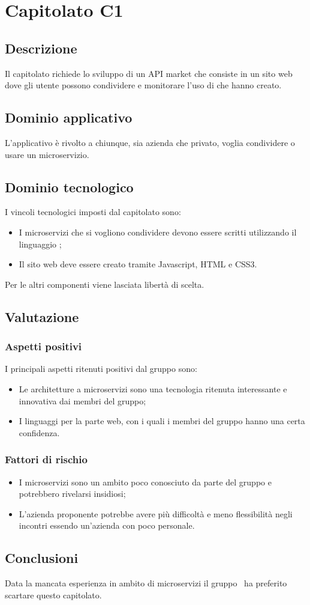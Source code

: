 \documentclass[../StudioDiFattibilita.tex]{subfiles}
\begin{document}
	\section{Capitolato C1}
		\subsection{Descrizione}
		Il capitolato richiede lo sviluppo di un API market che consiste in un sito web dove gli utente possono condividere e monitorare l'uso di  che hanno creato.
		\subsection{Dominio applicativo}
		L'applicativo è rivolto a chiunque, sia azienda che privato, voglia condividere o usare un microservizio.
		\subsection{Dominio tecnologico} 
		I vincoli tecnologici imposti dal capitolato sono:
		\begin{itemize}
			\item I microservizi che si vogliono condividere devono essere scritti utilizzando il linguaggio ;
			\item Il sito web deve essere creato tramite Javascript, HTML e CSS3.
		\end{itemize}
		Per le altri componenti viene lasciata libertà di scelta.
		\subsection{Valutazione}
			\subsubsection{Aspetti positivi}
			I principali aspetti ritenuti positivi dal gruppo sono:
				\begin{itemize}
				\item Le architetture a microservizi sono una tecnologia ritenuta interessante e innovativa dai membri del gruppo; 
				\item I linguaggi per la parte web, con i quali i membri del gruppo hanno una certa confidenza.
			\end{itemize}
			\subsubsection{Fattori di rischio}
				\begin{itemize}
				\item I microservizi sono un ambito poco conosciuto da parte del gruppo e potrebbero rivelarsi insidiosi;
				\item L'azienda proponente potrebbe avere più difficoltà e meno flessibilità negli incontri essendo un'azienda con poco personale.
			\end{itemize}
			\subsection{Conclusioni}
			Data la mancata esperienza in ambito di microservizi il gruppo \kaleidoscode\ ha preferito scartare questo capitolato.
\end{document}
